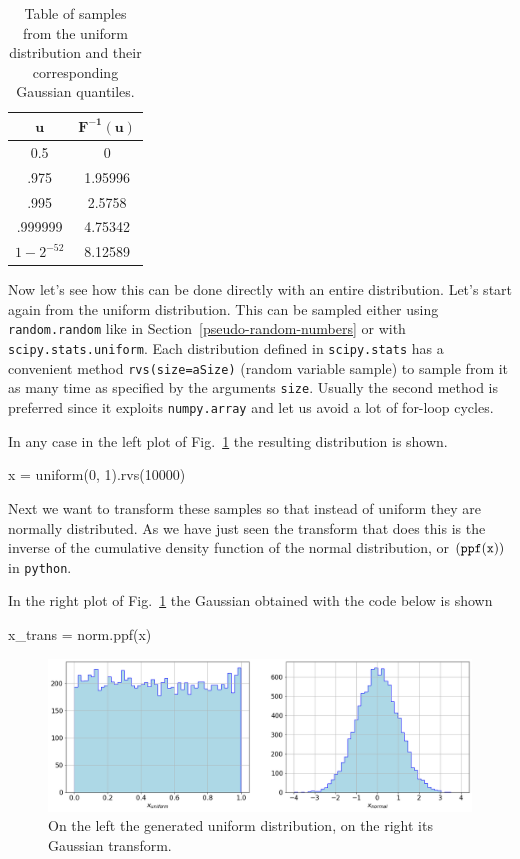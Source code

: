 \begin{table}[h]
  \centering
  \begin{tabular}{|c|c|}
    \hline
    \(\mathbf{u}\) & \(\mathbf{F^{-1}(u)}\) \\
    \hline
    0.5 & 0 \\
    \hline
    .975 & 1.95996 \\
    \hline
    .995 & 2.5758 \\
    \hline
    .999999 & 4.75342 \\
    \hline
    \(1-2^{-52}\) & 8.12589 \\
    \hline
  \end{tabular}
  \caption{Table of samples from the uniform distribution and their corresponding Gaussian quantiles.}
\label{tab:transformation}
\end{table}

Now let's see how this can be done directly with an entire distribution. Let's start again from the uniform distribution. This can be sampled either using \texttt{random.random} like in Section~\ref{pseudo-random-numbers} or with \texttt{scipy.stats.uniform}. 
Each distribution defined in \texttt{scipy.stats} has a convenient method \texttt{rvs(size=aSize)} (random variable sample) to sample from it as many time as specified by the arguments \texttt{size}. Usually the second method is preferred since it exploits \texttt{numpy.array} and let us avoid a lot of for-loop cycles.

In any case in the left plot of Fig.~\ref{fig:uniform_and_gauss} the resulting distribution is shown.

\begin{ipython}
x = uniform(0, 1).rvs(10000)
\end{ipython}

Next we want to transform these samples so that instead of uniform they are normally distributed. As we have just seen the transform that does this is the inverse of the cumulative density function of the normal distribution, or \((\tt{ppf(x))}\) in \texttt{python}. 

In the right plot of Fig.~\ref{fig:uniform_and_gauss} the Gaussian obtained with the code below is shown

\begin{ipython}
x_trans = norm.ppf(x)
\end{ipython}

\begin{figure}[htb]
	\centering
	\includegraphics[width=1.\textwidth]{figures/uniform_gauss}
	\caption{On the left the generated uniform distribution, on the right its Gaussian transform.}
	\label{fig:uniform_and_gauss}
\end{figure}

